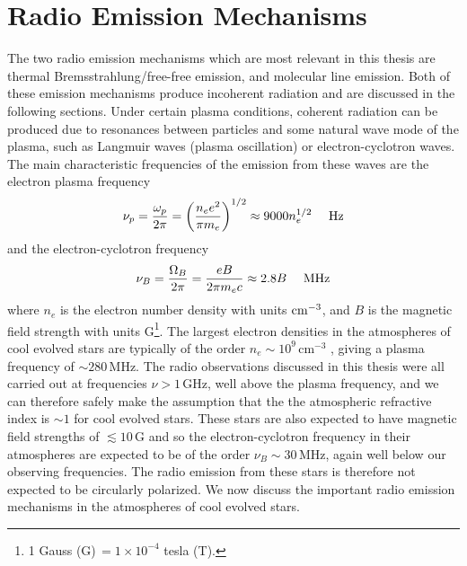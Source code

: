 \section{Radio Emission Mechanisms}\label{sec:1.7}
The two radio emission mechanisms which are most relevant in this thesis are thermal Bremsstrahlung/free-free emission, and molecular line emission. Both of these emission mechanisms produce incoherent radiation and are discussed in the following sections. Under certain plasma conditions, coherent radiation can be produced due to resonances between particles and some natural wave mode of the plasma, such as Langmuir waves (plasma oscillation) or electron-cyclotron waves. The main characteristic frequencies of the emission from these waves are the electron plasma frequency
\begin{equation}
\nu _{p} = \frac{\omega _{p}}{2\pi}=\left( \frac{n_e e^2}{\pi m_e}\right)^{1/2} \approx 9000 n_e ^{1/2}\ \ \ \ \rm{Hz}
\end{equation}
and the electron-cyclotron frequency
\begin{equation}
\nu _{B}= \frac{\Omega _{B}}{2\pi}=\frac{eB}{2\pi m_e c} \approx 2.8B\ \ \ \ \rm{MHz}
\end{equation}
where $n_e$ is the electron number density with units $\rm{cm}^{-3}$, and $B$ is the magnetic field strength with units G\footnote{1 Gauss (G)\,$= 1\times 10^{-4}$ tesla (T).}. The largest electron densities in the atmospheres of cool evolved stars are typically of the order $n_{e} \sim 10^{9}$\,cm$^{-3}$ \citep{judge_1998}, giving a plasma frequency of $\sim 280$\,MHz. The radio observations discussed in this thesis were all carried out at frequencies $\nu > 1$\,GHz, well above the plasma frequency, and we can therefore safely make the assumption that the the atmospheric refractive index is $\sim 1$ for cool evolved stars. These stars are also expected to have magnetic field strengths of $\lesssim 10$\,G \cite[e.g.,][]{bedecarrax_2013,sennhauser_2011} and so the electron-cyclotron frequency in their atmospheres are expected to be of the order $\nu _{B} \sim 30$\,MHz, again well below our observing frequencies. The radio emission from these stars is therefore not expected to be circularly polarized. We now discuss the important radio emission mechanisms in the atmospheres of cool evolved stars.


